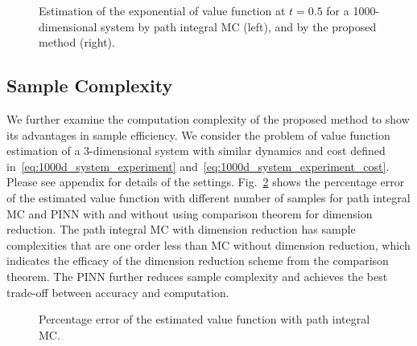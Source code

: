 \documentclass[letterpaper]{article} %
\newcommand{\resolved}[1]{}
\begin{document}
\begin{figure}[t]
  \begin{subfigure}{0.49\columnwidth}
  
  \end{subfigure}
  \begin{subfigure}{0.49\columnwidth}
  
  \end{subfigure}
  \caption{Estimation of the exponential of value function at $t=0.5$ for a 1000-dimensional system by path integral MC (left), and by the proposed method (right).}
  \label{fig:value_func_visual_1000d}
\end{figure}






\subsection{Sample Complexity}
We further examine the computation complexity of the proposed method to show its advantages in sample efficiency. We consider the problem of value function estimation of a 3-dimensional system with similar dynamics and cost defined in~\eqref{eq:1000d_system_experiment} and~\eqref{eq:1000d_system_experiment_cost}.
Please see appendix for details of the settings.
Fig.~\ref{fig:sample_complexity} shows the percentage error of the estimated value function with different number of samples for path integral MC and PINN with and without using comparison theorem for dimension reduction. The path integral MC with dimension reduction has sample complexities that are one order less than MC without dimension reduction, which indicates the efficacy of the dimension reduction scheme from the comparison theorem. The PINN further reduces sample complexity and achieves the best trade-off between accuracy and computation.

\begin{figure}
    \centering
    
    \caption{Percentage error of the estimated value function with path integral MC.}
    \resolved{refine the plot, use pdf format}
    \label{fig:sample_complexity}
\end{figure}
\end{document}
